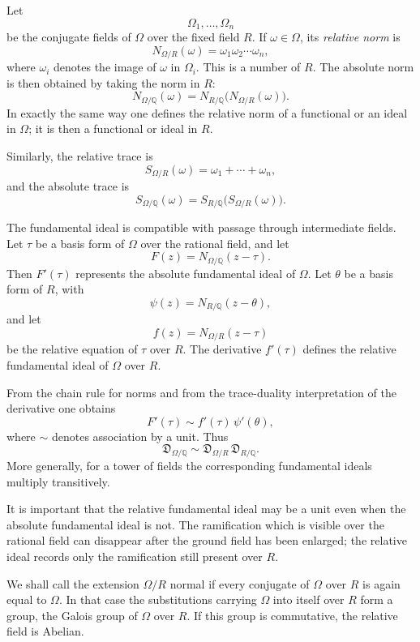\documentclass[11pt,a4paper]{book}
\newcommand{\D}{\mathfrak D}
\begin{document}
Let
\[
  \Omega_1,\ldots,\Omega_n
\]
be the conjugate fields of \(\Omega\) over the fixed field \(R\).  If \(\omega\in\Omega\), its \emph{relative norm} is
\[
  N_{\Omega/R}(\omega)=\omega_1\omega_2\cdots\omega_n,
\tag{1}
\]
where \(\omega_i\) denotes the image of \(\omega\) in \(\Omega_i\).  This is a number of \(R\).  The absolute norm is then obtained by taking the norm in \(R\):
\[
  N_{\Omega/\mathbb Q}(\omega)
     =N_{R/\mathbb Q}\bigl(N_{\Omega/R}(\omega)\bigr).
\tag{2}
\]
In exactly the same way one defines the relative norm of a functional or an ideal in \(\Omega\); it is then a functional or ideal in \(R\).

Similarly, the relative trace is
\[
  S_{\Omega/R}(\omega)=\omega_1+\cdots+\omega_n,
\tag{3}
\]
and the absolute trace is
\[
  S_{\Omega/\mathbb Q}(\omega)
      =S_{R/\mathbb Q}\bigl(S_{\Omega/R}(\omega)\bigr).
\tag{4}
\]

The fundamental ideal is compatible with passage through intermediate fields.  Let \(\tau\) be a basis form of \(\Omega\) over the rational field, and let
\[
  F(z)=N_{\Omega/\mathbb Q}(z-\tau).
\]
Then \(F'(\tau)\) represents the absolute fundamental ideal of \(\Omega\).  Let \(\theta\) be a basis form of \(R\), with
\[
  \psi(z)=N_{R/\mathbb Q}(z-\theta),
\]
and let
\[
  f(z)=N_{\Omega/R}(z-\tau)
\]
be the relative equation of \(\tau\) over \(R\).  The derivative \(f'(\tau)\) defines the relative fundamental ideal of \(\Omega\) over \(R\).

From the chain rule for norms and from the trace-duality interpretation of the derivative one obtains
\[
  F'(\tau)\sim f'(\tau)\,\psi'(\theta),
\tag{5}
\]
where \(\sim\) denotes association by a unit.  Thus
\[
  \D_{\Omega/\mathbb Q}
     \sim \D_{\Omega/R}\,\D_{R/\mathbb Q}.
\tag{6}
\]
More generally, for a tower of fields the corresponding fundamental ideals multiply transitively.

It is important that the relative fundamental ideal may be a unit even when the absolute fundamental ideal is not.  The ramification which is visible over the rational field can disappear after the ground field has been enlarged; the relative ideal records only the ramification still present over \(R\).

We shall call the extension \(\Omega/R\) normal if every conjugate of \(\Omega\) over \(R\) is again equal to \(\Omega\).  In that case the substitutions carrying \(\Omega\) into itself over \(R\) form a group, the Galois group of \(\Omega\) over \(R\).  If this group is commutative, the relative field is Abelian.
\end{document}
